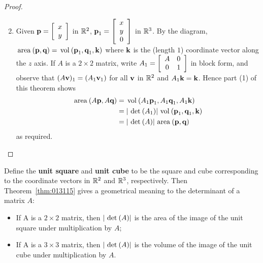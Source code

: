 \begin{proof}
\hspace{0em}\begin{enumerate}
\setcounter{enumi}{1}
\item Given $\textbf{p} = \left[
\begin{array}{c}
x\\
y 
\end{array}
\right]$
 in $\mathbb{R}^2$, 
$\textbf{p}_{1} = \left[
\begin{array}{c}
x \\
y \\
0
\end{array}
\right]$
in $\mathbb{R}^3$. By the diagram, $\thinspace\operatorname{area\medspace}(\textbf{p}, \textbf{q}) = \thinspace\operatorname{vol\medspace}(\textbf{p}_{1}, \textbf{q}_{1}, \textbf{k})$ where $\textbf{k}$ is the (length $1$) coordinate vector along the $z$ axis. If $A$ is a $2 \times 2$ matrix, write $A_{1} = \left[
\begin{array}{cc}
A & 0 \\
0 & 1
\end{array}
\right]$ in block form, and observe that $(A\textbf{v})_{1} = (A_{1}\textbf{v}_{1})$ for all $\textbf{v}$ in $\mathbb{R}^2$ and $A_{1}\textbf{k} = \textbf{k}$. Hence part (1) of this theorem shows
\begin{align*}
\thinspace\operatorname{area\medspace}(A\textbf{p}, A\textbf{q})
&= \thinspace\operatorname{vol\medspace}(A_{1}\textbf{p}_{1}, A_{1}\textbf{q}_{1}, A_{1}\textbf{k}) \\
&= |\thinspace\operatorname{det\medspace}(A_{1})|\thinspace\operatorname{vol\medspace}(\textbf{p}_{1}, \textbf{q}_{1}, \textbf{k})\\
&= |\thinspace\operatorname{det\medspace}(A)|\thinspace\operatorname{area\medspace}(\textbf{p}, \textbf{q})
\end{align*}
as required.
\end{enumerate}
\vspace*{-2em}\end{proof}

Define the \textbf{unit square} and \textbf{unit cube} to be the square and cube corresponding to the coordinate vectors in $\mathbb{R}^2$ and $\mathbb{R}^3$, respectively. Then Theorem~\ref{thm:013115} gives a geometrical meaning to the determinant of a matrix $A$:


\begin{itemize}
\item If A is a $2 \times 2$ matrix, then $|\thinspace\operatorname{det\medspace}(A)|$ is the area of the image of the unit square under multiplication by $A$;

\item If A is a $3 \times 3$ matrix, then $|\thinspace\operatorname{det\medspace}(A)|$ is the volume of the image of the unit cube under multiplication by $A$.

\end{itemize}

